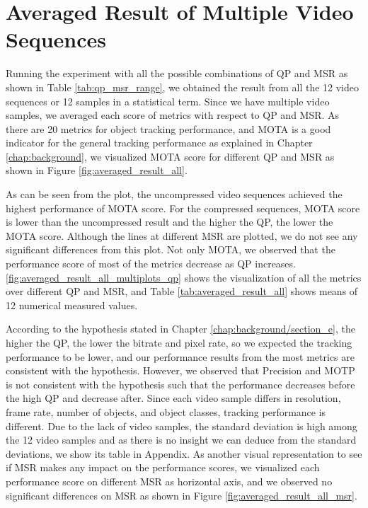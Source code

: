 \section{Averaged Result of Multiple Video Sequences}
\label{sec:results/section_a}

Running the experiment with all the possible combinations of QP and MSR as shown in Table \ref{tab:qp_msr_range}, we obtained the result from all the 12 video sequences or 12 samples in a statistical term. Since we have multiple video samples, we averaged each score of metrics with respect to QP and MSR. As there are 20 metrics for object tracking performance, and MOTA is a good indicator for the general tracking performance as explained in Chapter \ref{chap:background}, we visualized MOTA score for different QP and MSR as shown in Figure \ref{fig:averaged_result_all}.

As can be seen from the plot, the uncompressed video sequences achieved the highest performance of MOTA score. For the compressed sequences, MOTA score is lower than the uncompressed result and the higher the QP, the lower the MOTA score. Although the lines at different MSR are plotted, we do not see any significant differences from this plot. Not only MOTA, we observed that the performance score of most of the metrics decrease as QP increases. \ref{fig:averaged_result_all_multiplots_qp} shows the visualization of all the metrics over different QP and MSR, and Table \ref{tab:averaged_result_all} shows means of 12 numerical measured values.


According to the hypothesis stated in Chapter \ref{chap:background/section_e}, the higher the QP, the lower the bitrate and pixel rate, so we expected the tracking performance to be lower, and our performance results from the most metrics are consistent with the hypothesis. However, we observed that Precision and MOTP is not consistent with the hypothesis such that the performance decreases before the high QP and decrease after. Since each video sample differs in resolution, frame rate, number of objects, and object classes, tracking performance is different. Due to the lack of video samples, the standard deviation is high among the 12 video samples and as there is no insight we can deduce from the standard deviations, we show its table in Appendix. As another visual representation to see if MSR makes any impact on the performance scores, we visualized each performance score on different MSR as horizontal axis, and we observed no significant differences on MSR as shown in Figure \ref{fig:averaged_result_all_msr}.
